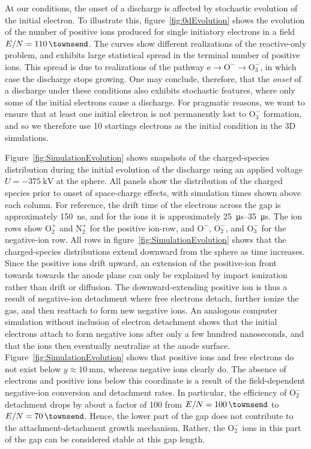 \documentclass{iopjournal}
\newcommand{\todo}[1]{\color{red}{#1}\color{black}}
\newcommand{\e}{\ensuremath{\text{e}}}
\providecommand\Ntwop{\ensuremath{\textrm{N}_2^+}}
\providecommand\Otwop{\ensuremath{\textrm{O}_2^+}}
\providecommand\Otwom{\ensuremath{\textrm{O}_2^-}}
\providecommand\Othreem{\ensuremath{\textrm{O}_3^-}}
\providecommand\Ominus{\ensuremath{\textrm{O}^-}}
\begin{document}
At our conditions, the onset of a discharge is affected by stochastic evolution of the initial electron.
To illustrate this, figure~\ref{fig:0dEvolution} shows the evolution of the number of positive ions produced for single initiatory electrons in a field $E/N = \SI{110}{\townsend}$.
The curves show different realizations of the reactive-only problem, and exhibits large statistical spread in the terminal number of positive ions.
This spread is due to realizations of the pathway $\e \rightarrow \Ominus \rightarrow \Othreem$, in which case the discharge stops growing.
One may conclude, therefore, that the \emph{onset} of a discharge under these conditions also exhibits stochastic features, where only some of the initial electrons cause a discharge.
For pragmatic reasons, we want to ensure that at least one initial electron is not permanently lost to $\Othreem$ formation, and so we therefore use 10 startings electrons as the initial condition in the 3D simulations.

Figure~\ref{fig:SimulationEvolution} shows snapshots of the charged-species distribution during the initial evolution of the discharge using an applied voltage $U=-\SI{375}{\kilo\volt}$ at the sphere.
All panels show the distribution of the charged species prior to onset of space-charge effects, with simulation times shown above each column.
For reference, the drift time of the electrons across the gap is approximately \SI{150}{\nano\second}, and for the ions it is approximately \SIrange{25}{35}{\micro\second}.
The ion rows show $\Otwop$ and $\Ntwop$ for the positive ion-row, and $\Ominus$, $\Otwom$, and $\Othreem$ for the negative-ion row.
\todo{Stuff below here needs to be rewritten when the simulations end}
All rows in figure~\ref{fig:SimulationEvolution} shows that the charged-species distributions extend downward from the sphere as time increases.
Since the positive ions drift upward, an extension of the positive-ion front towards towards the anode plane can only be explained by impact ionization rather than drift or diffusion.
The downward-extending positive ion is thus a result of negative-ion detachment where free electrons detach, further ionize the gas, and then reattach to form new negative ions.
An analogous computer simulation without inclusion of electron detachment shows that the initial electrons attach to form negative ions after only a few hundred nanoseconds, and that the ions then eventually neutralize at the anode surface.
Figure~\ref{fig:SimulationEvolution} shows that positive ions and free electrons do not exist below $y\approx\SI{10}{\milli\meter}$, whereas negative ions clearly do.
The absence of electrons and positive ions below this coordinate is a result of the field-dependent negative-ion conversion and detachment rates.
In particular, the efficiency of $\Otwom$ detachment drops by about a factor of \num{100} from $E/N = \SI{100}{\townsend}$ to $E/N = \SI{70}{\townsend}$.
Hence, the lower part of the gap does not contribute to the attachment-detachment growth mechanism.
Rather, the $\Otwom$ ions in this part of the gap can be considered stable at this gap length.
\end{document}
